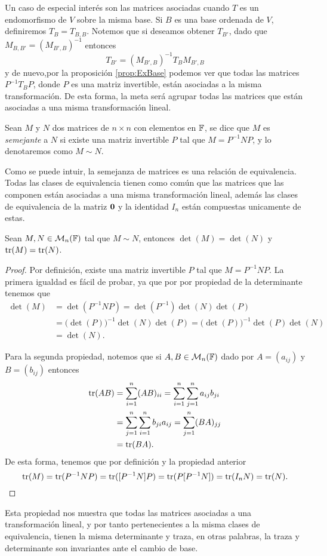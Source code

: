 Un caso de especial interés son las matrices asociadas cuando $T$ es un endomorfismo de $V$ sobre la misma base. Si $B$ es una base ordenada de $V$, definiremos $T_B = T_{B,B}$. Notemos que si deseamos obtener $T_{B'}$, dado que $M_{B,B'} = (M_{B',B})^{-1}$ entonces 
  \[ T_{B'} = (M_{B',B})^{-1} T_B M_{B',B} \]
y de nuevo,por la proposición \ref{prop:ExBase} podemos ver que todas las matrices $P^{-1}T_{B}P$, donde $P$ es una matriz invertible, están asociadas a la misma transformación. De esta forma, la meta será agrupar todas las matrices que están asociadas a una misma transformación lineal.

\begin{defi}
  Sean $M$ y $N$ dos matrices de $n \times n$ con elementos en $\mathbb{F}$, se dice que $M$ es \emph{semejante} a $N$ si existe una matriz invertible $P$ tal que $M = P^{-1}NP$, y lo denotaremos como $M \sim N$.
\end{defi}

Como se puede intuir, la semejanza de matrices es una relación de equivalencia. Todas las clases de equivalencia tienen como común que las matrices que las componen están asociadas a una misma transformación lineal, además las clases de equivalencia de la matriz $\mathbf{0}$ y la identidad $I_n$ están compuestas unicamente de estas. 

\begin{prop}
  Sean $M,N \in \mathcal{M}_n(\mathbb{F})$ tal que $M \sim N$, entonces $\det(M) = \det(N)$ y $\operatorname{tr}(M) = \operatorname{tr}(N)$.
\end{prop}
\begin{proof}
  Por definición, existe una matriz invertible $P$ tal que $M = P^{-1}NP$. La primera igualdad es fácil de probar, ya que por por propiedad de la determinante tenemos  que
  \begin{align*}
    \det(M) &= \det(P^{-1}NP) = \det(P^{-1})\det(N) \det(P)  \\
      &= \bigl(\det(P)\bigr)^{-1} \det(N) \det(P) = \bigl(\det(P)\bigr)^{-1}\det(P)\det(N)  \\
      &= \det(N).
  \end{align*}
  
  Para la segunda propiedad, notemos que si $A,B \in \mathcal{M}_n(\mathbb{F})$ dado por $A = (a_{ij})$ y $B = (b_{ij})$ entonces
  \begin{align*}
    \operatorname{tr}(AB) &= \sum_{i=1}^n (AB)_{ii} = \sum_{i=1}^n \sum_{j=1}^n a_{ij} b_{ji} \\
      &=  \sum_{j=1}^n \sum_{i=1}^n b_{ji} a_{ij} = \sum_{j=1}^n (BA)_{jj} \\
      &= \operatorname{tr}(BA).
  \end{align*}
  De esta forma, tenemos que por definición y la propiedad anterior
  \[ \operatorname{tr}(M) = \operatorname{tr}(P^{-1}NP) = \operatorname{tr}([P^{-1}N]P) = \operatorname{tr}(P[P^{-1}N]) = \operatorname{tr}(I_n N) = \operatorname{tr}(N). \]
\end{proof}

Esta propiedad nos muestra que todas las matrices asociadas a una transformación lineal, y por tanto pertenecientes a la misma clases de equivalencia, tienen la misma determinante y traza, en otras palabras, la traza y determinante son invariantes ante el cambio de base.



